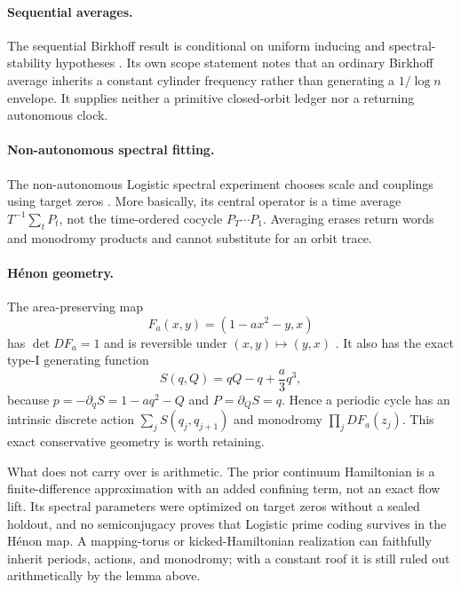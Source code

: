 \documentclass[11pt]{article}
\theoremstyle{definition}
\theoremstyle{remark}
\begin{document}
\paragraph{Sequential averages.}
The sequential Birkhoff result is conditional on uniform inducing and
spectral-stability hypotheses \citep{Wang2026Birkhoff}.  Its own scope statement
notes that an ordinary Birkhoff average inherits a constant cylinder frequency
rather than generating a \(1/\log n\) envelope.  It supplies neither a
primitive closed-orbit ledger nor a returning autonomous clock.

\paragraph{Non-autonomous spectral fitting.}
The non-autonomous Logistic spectral experiment chooses scale and couplings
using target zeros \citep{Wang2026Logistic}.  More basically, its central
operator is a time average \(T^{-1}\sum_tP_t\), not the time-ordered cocycle
\(P_T\cdots P_1\).  Averaging erases return words and monodromy products and
cannot substitute for an orbit trace.

\paragraph{H\'enon geometry.}
The area-preserving map
\begin{equation}
 F_a(x,y)=(1-ax^2-y,x)
 \label{eq:henon}
\end{equation}
has \(\det DF_a=1\) and is reversible under \((x,y)\mapsto(y,x)\)
\citep{Wang2026Henon}.  It also has the exact type-I generating function
\begin{equation}
 S(q,Q)=qQ-q+\frac{a}{3}q^3,
 \label{eq:gfunction}
\end{equation}
because \(p=-\partial_qS=1-aq^2-Q\) and \(P=\partial_QS=q\).  Hence a
periodic cycle has an intrinsic discrete action \(\sum_jS(q_j,q_{j+1})\) and
monodromy \(\prod_jDF_a(z_j)\).  This exact conservative geometry is worth
retaining.

What does not carry over is arithmetic.  The prior continuum Hamiltonian is a
finite-difference approximation with an added confining term, not an exact
flow lift.  Its spectral parameters were optimized on target zeros without a
sealed holdout, and no semiconjugacy proves that Logistic prime coding survives
in the H\'enon map.  A mapping-torus or kicked-Hamiltonian realization can
faithfully inherit periods, actions, and monodromy; with a constant roof it is
still ruled out arithmetically by the lemma above.
\end{document}
